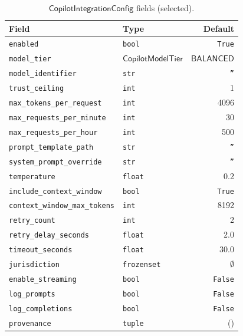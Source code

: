 \documentclass[11pt]{article}
\newcommand{\CIC}{\mathsf{CopilotIntegrationConfig}}
\newcommand{\CMT}{\mathsf{CopilotModelTier}}
\newcommand{\BALANCED}{\mathsf{BALANCED}}
\begin{document}
\begin{table}[t]
\centering
\caption{$\CIC$ fields (selected).}
\label{tab:config-fields}
\begin{tabular}{@{}llr@{}}
\toprule
Field & Type & Default \\
\midrule
\texttt{enabled}                 & \texttt{bool}       & \texttt{True} \\
\texttt{model\_tier}             & $\CMT$              & $\BALANCED$ \\
\texttt{model\_identifier}       & \texttt{str}        & \texttt{''} \\
\texttt{trust\_ceiling}          & \texttt{int}        & 1 \\
\texttt{max\_tokens\_per\_request} & \texttt{int}      & 4096 \\
\texttt{max\_requests\_per\_minute} & \texttt{int}     & 30 \\
\texttt{max\_requests\_per\_hour}  & \texttt{int}      & 500 \\
\texttt{prompt\_template\_path}  & \texttt{str}        & \texttt{''} \\
\texttt{system\_prompt\_override}& \texttt{str}        & \texttt{''} \\
\texttt{temperature}             & \texttt{float}      & 0.2 \\
\texttt{include\_context\_window}& \texttt{bool}       & \texttt{True} \\
\texttt{context\_window\_max\_tokens} & \texttt{int}   & 8192 \\
\texttt{retry\_count}            & \texttt{int}        & 2 \\
\texttt{retry\_delay\_seconds}   & \texttt{float}      & 2.0 \\
\texttt{timeout\_seconds}        & \texttt{float}      & 30.0 \\
\texttt{jurisdiction}            & \texttt{frozenset}  & $\emptyset$ \\
\texttt{enable\_streaming}       & \texttt{bool}       & \texttt{False} \\
\texttt{log\_prompts}            & \texttt{bool}       & \texttt{False} \\
\texttt{log\_completions}        & \texttt{bool}       & \texttt{False} \\
\texttt{provenance}              & \texttt{tuple}      & () \\
\bottomrule
\end{tabular}
\end{table}
\end{document}
